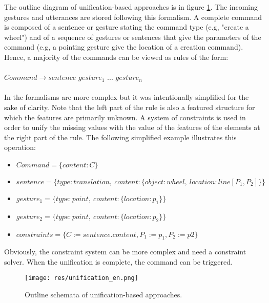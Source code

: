 \documentclass[a4paper]{article}
\begin{document}
The outline diagram of unification-based approaches is in figure \ref{fig:unification}. The incoming gestures and utterances are stored following this formalism. A complete command is composed of a sentence or gesture stating the command type (e.g, "create a wheel") and of a sequence of gestures or sentences that give the parameters of the command (e.g, a pointing gesture give the location of a creation command). Hence, a majority of the commands can be viewed as rules of the form:
\\\\
$Command \rightarrow sentence$ $gesture_1$ $...$ $gesture_n$
\\\\
In \cite{unification-based} the formalisms are more complex but it was intentionally simplified for the sake of clarity. Note that the left part of the rule is also a featured structure for which the features are primarily unknown. A system of constraints is used in order to unify the missing values with the value of the features of the elements at the right part of the rule. The following simplified example illustrates this operation:

\begin{itemize}
	\item $Command = \lbrace content: C \rbrace$ 
	\item $sentence = \lbrace type: translation, \: content: \lbrace object: wheel, \: location: line[P_1, P_2] \rbrace\rbrace$
	\item $gesture_1 = \lbrace type: point,\: content: \lbrace location: p_1 \rbrace\rbrace$
	\item $gesture_2 = \lbrace type: point,\: content: \lbrace location: p_2 \rbrace\rbrace$
	\item $constraints = \lbrace C := sentence.content, P_1 := p_1, P_2 := p2 \rbrace$
\end{itemize}

Obviously, the constraint system can be more complex and need a constraint solver. When the unification is complete, the command can be triggered.

\begin{figure}[!h]
\centering
\texttt{[image: res/unification\_en.png]}
\caption{\label{fig:unification}Outline schemata of unification-based approaches.}
\end{figure}
\end{document}
